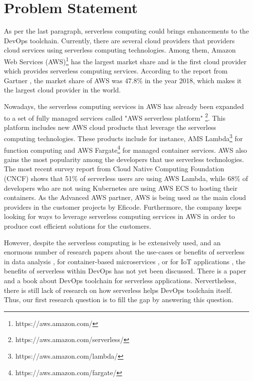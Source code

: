 \section{Problem Statement}
As per the last paragraph, serverless computing could brings enhancements to the DevOps toolchain. Currently, there are several cloud providers that providers cloud services using serverless computing technologies. 
Among them, Amazon Web Services (AWS)\footnote{https://aws.amazon.com/} has the largest market share and is the first cloud provider which provides serverless computing services. According to the report from Gartner \cite{GartnerS47:online}, the market share of AWS was 47.8\% in the year 2018, which makes it the largest cloud provider in the world.
\par
Nowadays, the serverless computing services in AWS has already been expanded to a set of fully managed services called "AWS serverless platform" \footnote{https://aws.amazon.com/serverless/}. This platform includes new AWS cloud products that leverage the serverless computing technologies. These products include for instance, AMS Lambda\footnote{https://aws.amazon.com/lambda/} for function computing and AWS Fargate\footnote{https://aws.amazon.com/fargate/} for managed container services.
AWS also gains the most popularity among the developers that use serverless technologies. The most recent survey report \cite{cncf2020} from Cloud Native Computing Foundation (CNCF) shows that 51\% of serverless users are using AWS Lambda, while 68\% of developers who are not using Kubernetes are using AWS ECS to hosting their containers.
As the Advanced AWS partner, AWS is being used as the main cloud providers in the customer projects by Eficode. Furthermore, the company keeps looking for ways to leverage serverless computing services in AWS in order to produce cost efficient solutions for the customers.
\par
However, despite the serverless computing is be extensively used, and an enormous number of research papers about the use-cases or benefits of serverless in data analysis \cite{8457831}, for container-based microservices \cite{perez2018serverless}, or for IoT applications \cite{nastic2017serverless} \cite{glikson2017deviceless}, the benefits of serverless within DevOps has not yet been discussed. There is a paper \cite{ivanov2018implementation} and a book \cite{bangera2018devops} about DevOps toolchain for serverless applications. Nervertheless, there is still lack of research on how serverless helps DevOps toolchain itself. Thus, our first research question is to fill the gap by answering this question. 
